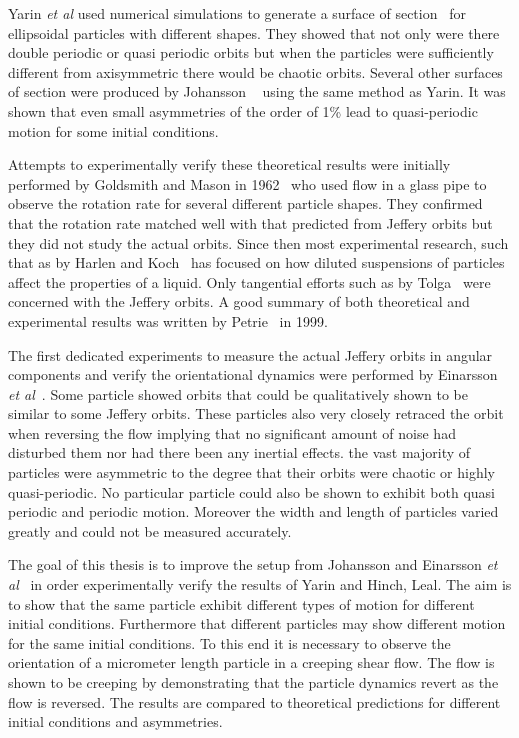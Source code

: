 Yarin \emph{et al} used numerical simulations to generate a surface of section~\cite{SurfaceOfSection} for ellipsoidal particles with different shapes. They showed that not only were there double periodic or quasi periodic orbits but when the particles were sufficiently different from axisymmetric there would be chaotic orbits. 
Several other surfaces of section were produced by Johansson ~\cite{AntonThesis} using the same method as Yarin. It was shown that even small asymmetries of the order of 1\% lead to quasi-periodic motion for some initial conditions.

Attempts to experimentally verify these theoretical results were initially performed by Goldsmith and Mason in 1962~\cite{Mason} who used flow in a glass pipe to observe the rotation rate for several different particle shapes. They confirmed that the rotation rate matched well with that predicted from Jeffery orbits but they did not study the actual orbits. Since then most experimental research, such that as by Harlen and Koch~\cite{fibersspension} has focused on how diluted suspensions of particles affect the properties of a liquid. Only tangential efforts such as by Tolga~\cite{Tolga} were concerned with the Jeffery orbits. A good summary of both theoretical and experimental results was written by Petrie~\cite{Petrie} in 1999.

The first dedicated experiments to measure the actual Jeffery orbits in angular components and verify the orientational dynamics were performed by Einarsson \emph{et al}~\cite{JonasExperiment}. Some particle showed orbits that could be qualitatively shown to be similar to some Jeffery orbits. These particles also very closely retraced the orbit when reversing the flow implying that no significant amount of noise had disturbed them nor had there been any inertial effects. the vast majority of particles were asymmetric to the degree that their orbits were chaotic or highly quasi-periodic. No particular particle could also be shown to exhibit both quasi periodic and periodic motion. Moreover the width and length of particles varied greatly and could not be measured accurately.

The goal of this thesis is to improve the setup from Johansson\cite{AntonThesis} and Einarsson \emph{et al}~\cite{JonasExperiment} in order experimentally verify the results of Yarin and Hinch, Leal\cite{Yarin, Leal}. The aim is to show that the same particle exhibit different types of motion for different initial conditions. Furthermore that different particles may show different motion for the same initial conditions. To this end it is necessary to observe the orientation of a micrometer length particle in a creeping shear flow. The flow is shown to be creeping by demonstrating that the particle dynamics revert as the flow is reversed. The results are compared to theoretical predictions for different initial conditions and asymmetries.

